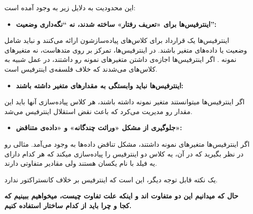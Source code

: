 این محدودیت به دلایل زیر به وجود آمده است:

\begin{itemize}
\tightlist
\item
  \textbf{اینترفیس‌ها برای «تعریف رفتار» ساخته شدند، نه ``نگه‌داری
  وضعیت'':}
\end{itemize}

اینترفیس‌ها یک قرارداد  برای کلاس‌های پیاده‌سازشون ارائه
می‌کنند و نباید شامل وضعیت  یا داده‌های متغیر باشند. در
اینترفیس‌ها، تمرکز بر روی متدهاست، نه متغیرهای نمونه . اگر اینترفیس‌ها
اجازه‌ی داشتن متغیرهای نمونه رو داشتند، در عمل شبیه به کلاس‌های
 می‌شدند که خلاف فلسفه‌ی اینترفیس است.

\begin{itemize}
\tightlist
\item
  \textbf{اینترفیس‌ها نباید وابستگی به مقدارهای متغیر داشته باشند:}
\end{itemize}

اگر اینترفیس‌ها میتوانستند متغیر نمونه داشته باشند، هر کلاس پیاده‌سازی
آنها باید این مقدار رو مدیریت می‌کرد که باعث نقض استقلال اینترفیس می‌شد.

\begin{itemize}
\tightlist
\item
  \textbf{جلوگیری از مشکل «وراثت چندگانه» و «داده‌ی متناقض»:}
\end{itemize}

اگر اینترفیس‌ها متغیرهای نمونه داشتند، مشکل تناقض داده‌ها به وجود می‌آمد.
مثالی رو در نظر بگیرید که در آن، یه کلاس دو اینترفیس را پیاده‌سازی میکند
که هر کدام دارای یه فیلد با نام یکسان هستند ولی مقادیر متفاوتی دارند.

یک نکته قابل توجه دیگر، این است که اینترفیس بر خلاف 
کانستراکتور ندارد.

\textbf{حال که میدانیم این دو متفاوت اند و اینکه علت تفاوت چیست،
میخواهیم ببینیم که کجا و چرا باید از کدام ساختار استفاده کنیم.}

